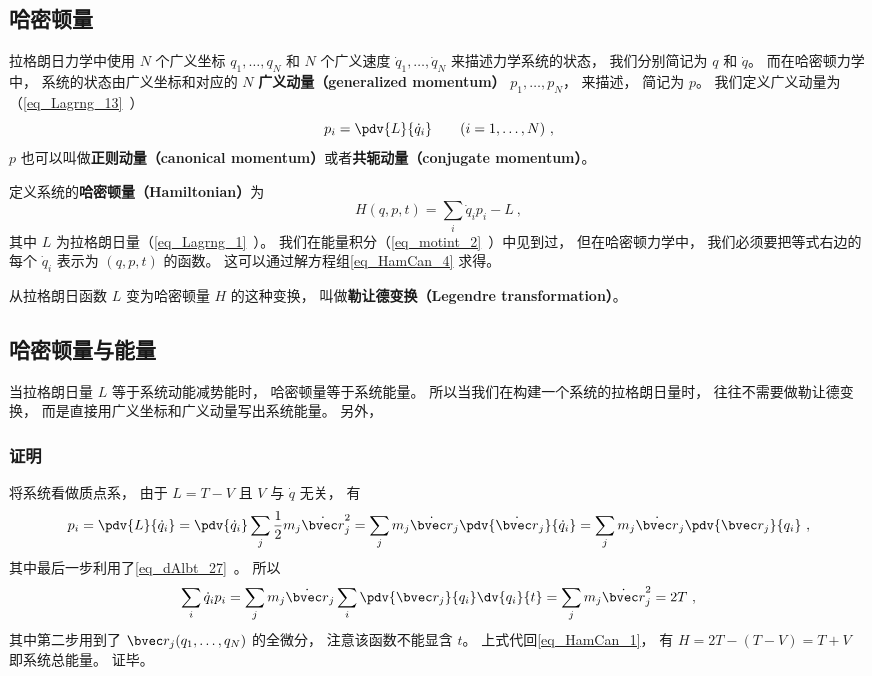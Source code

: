 

\subsection{哈密顿量}
拉格朗日力学中使用 $N$ 个广义坐标 $q_1,\dots,q_N$ 和 $N$ 个广义速度 $\dot q_1,\dots,\dot q_N$ 来描述力学系统的状态， 我们分别简记为 $q$ 和 $\dot q$。 而在哈密顿力学中， 系统的状态由广义坐标和对应的 $N$ \textbf{广义动量（generalized momentum）} $p_1, \dots, p_N$， 来描述， 简记为 $p$。 我们定义广义动量为（\autoref{eq_Lagrng_13}~）
\begin{equation}\label{eq_HamCan_4}
p_i = \pdv{L}{\dot q_i} \qquad (i = 1,\dots,N)~,
\end{equation}
$p$ 也可以叫做\textbf{正则动量（canonical momentum）}或者\textbf{共轭动量（conjugate momentum）}。

定义系统的\textbf{哈密顿量（Hamiltonian）}为
\begin{equation}\label{eq_HamCan_1}
H(q,p,t) = \sum_i \dot q_i p_i - L~,
\end{equation}
其中 $L$ 为拉格朗日量（\autoref{eq_Lagrng_1}~）。 我们在能量积分（\autoref{eq_motint_2}~）中见到过， 但在哈密顿力学中， 我们必须要把等式右边的每个 $\dot q_i$ 表示为 $(q,p,t)$ 的函数。 这可以通过解方程组\autoref{eq_HamCan_4} 求得。

从拉格朗日函数 $L$ 变为哈密顿量 $H$ 的这种变换， 叫做\textbf{勒让德变换（Legendre transformation）}。

\subsection{哈密顿量与能量}
当拉格朗日量 $L$ 等于系统动能减势能时， 哈密顿量等于系统能量。 所以当我们在构建一个系统的拉格朗日量时， 往往不需要做勒让德变换， 而是直接用广义坐标和广义动量写出系统能量。 另外， 

\subsubsection{证明}
将系统看做质点系， 由于 $L = T - V$ 且 $V$ 与 $\dot q$ 无关， 有
\begin{equation}\label{eq_HamCan_6}
p_i = \pdv{L}{\dot q_i} = \pdv{\dot q_i} \sum_j \frac12 m_j \dot{\bvec r}_j^2
= \sum_j m_j \dot{\bvec r}_j \pdv{\dot{\bvec r}_j}{\dot q_i}
= \sum_j m_j \dot{\bvec r}_j  \pdv{\bvec r_j}{q_i}~,
\end{equation}
其中最后一步利用了\autoref{eq_dAlbt_27}~。 所以
\begin{equation}
 \sum_i \dot q_i p_i = \sum_j m_j \dot{\bvec r}_j \sum_i \pdv{\bvec r_j}{q_i}\dv{q_i}{t}
= \sum_j m_j \dot{\bvec r}_j^2 = 2T~,
\end{equation}
其中第二步用到了 $\bvec r_j(q_1,\dots,q_N)$ 的全微分， 注意该函数不能显含 $t$。 上式代回\autoref{eq_HamCan_1}， 有 $H = 2T - (T - V) = T + V$ 即系统总能量。 证毕。

